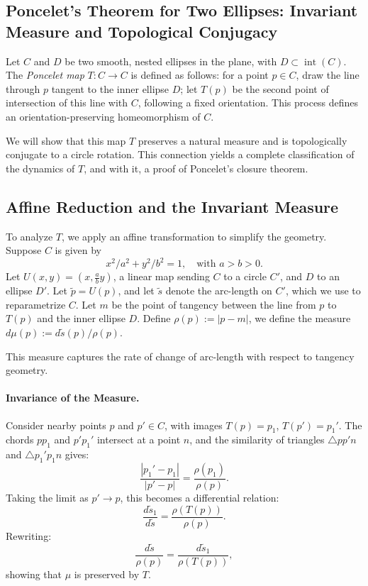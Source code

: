 \begin{technical}
\section*{Poncelet’s Theorem for Two Ellipses: Invariant Measure and Topological Conjugacy}

Let \( C \) and \( D \) be two smooth, nested ellipses in the plane, with \( D \subset \operatorname{int}(C) \). The \emph{Poncelet map} \( T: C \to C \) is defined as follows: for a point \( p \in C \), draw the line through \( p \) tangent to the inner ellipse \( D \); let \( T(p) \) be the second point of intersection of this line with \( C \), following a fixed orientation. This process defines an orientation-preserving homeomorphism of \( C \).

We will show that this map \( T \) preserves a natural measure and is topologically conjugate to a circle rotation. This connection yields a complete classification of the dynamics of \( T \), and with it, a proof of Poncelet’s closure theorem.

\subsection*{Affine Reduction and the Invariant Measure}

To analyze \( T \), we apply an affine transformation to simplify the geometry. Suppose \( C \) is given by
\[
{x^2}/{a^2} + {y^2}/{b^2} = 1, \quad \text{with } a > b > 0.
\]
Let \( U(x, y) = (x, \frac{a}{b} y) \), a linear map sending \( C \) to a circle \( C' \), and \( D \) to an ellipse \( D' \). Let \( \tilde{p} = U(p) \), and let \( \tilde{s} \) denote the arc-length on \( C' \), which we use to reparametrize \( C \). Let \( m \) be the point of tangency between the line from \( p \) to \( T(p) \) and the inner ellipse \( D \). Define $\rho(p) := |p - m|$, we define the measure $d\mu(p) := {d\tilde{s}(p)}/{\rho(p)}$.

This measure captures the rate of change of arc-length with respect to tangency geometry.

\paragraph{Invariance of the Measure.} Consider nearby points \( p \) and \( p' \in C \), with images \( T(p) = p_1 \), \( T(p') = p_1' \). The chords \( pp_1 \) and \( p'p_1' \) intersect at a point \( n \), and the similarity of triangles \( \triangle pp'n \) and \( \triangle p_1'p_1n \) gives:
\[
\frac{|p_1' - p_1|}{|p' - p|} = \frac{\rho(p_1)}{\rho(p)}.
\]
Taking the limit as \( p' \to p \), this becomes a differential relation:
\[
\frac{d\tilde{s}_1}{d\tilde{s}} = \frac{\rho(T(p))}{\rho(p)}.
\]
Rewriting:
\[
\frac{d\tilde{s}}{\rho(p)} = \frac{d\tilde{s}_1}{\rho(T(p))},
\]
showing that \( \mu \) is preserved by \( T \).


\end{technical}
